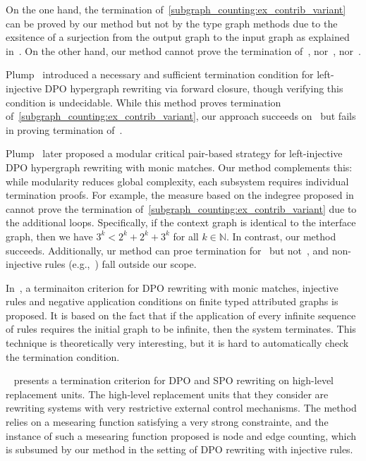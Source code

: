 On the one hand, the termination of~\autoref{subgraph_counting:ex_contrib_variant} can be proved by our method but not by the type graph methods due to the exsitence of a surjection from the output graph to the input graph as explained in~\cite[Example D.4]{endrullis2024generalized_arxiv_v2}. On the other hand, our method cannot prove the termination of~\cite[Example 1, 5 and Ad-hoc Routing Protocol]{bruggink2014termination}, nor~\cite[Example 5, 6]{bruggink2015proving}, nor~\cite[Examples D2 and D3]{endrullis2024generalized_arxiv_v2}.

Plump~\cite{plump1995ontermination} introduced a necessary and sufficient termination condition for left-injective DPO hypergraph rewriting via forward closure, though verifying this condition is undecidable. 
While this method proves termination of~\autoref{subgraph_counting:ex_contrib_variant}, our approach succeeds on~\cite[Example 3.8]{plump1995ontermination} but fails in proving termination of~\cite[Example 4.1]{plump1995ontermination}. 

Plump~\cite{plump2018modular} later proposed a modular critical pair-based strategy for left-injective DPO hypergraph rewriting with monic matches. 
Our method complements this: while modularity reduces global complexity, each subsystem requires individual termination proofs. For example, the measure based on the indegree proposed in~\cite{plump2018modular} cannot prove the termination of~\autoref{subgraph_counting:ex_contrib_variant} due to the additional loops. Specifically, if the context graph is identical to the interface graph, then we have $3^k < 2^k+2^k+3^k$ for all $k \in \mathbb{N}$. In contrast, our method succeeds.
Additionally, ur method can proe termination for~\cite[Examples 1 and 5]{plump2018modular} but not~\cite[Example 4]{plump2018modular}, and non-injective rules (e.g.,~\cite[Example 6]{plump2018modular}) fall outside our scope.

In~\cite{levendovszky2007termination}, a terminaiton criterion for DPO rewriting with monic matches, injective rules and negative application conditions on finite typed attributed graphs is proposed. It is based on the fact that if the application of every infinite sequence of rules requires the initial graph to be infinite, then the system terminates. This technique is theoretically very interesting, but it is hard to automatically check the termination condition.

~\cite{bottoni2005termination} presents a termination criterion for DPO and SPO rewriting on high-level replacement units. The high-level replacement units that they consider are rewriting systems with very restrictive external control mechanisms. The method relies on a mesearing function satisfying a very strong constrainte, and the instance of such a mesearing function proposed is node and edge counting, which is subsumed by our method in the setting of DPO rewriting with injective rules.

